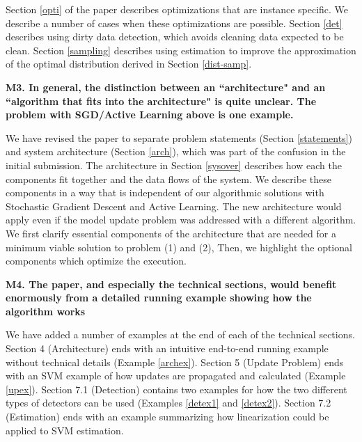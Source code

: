 Section \ref{opti} of the paper describes optimizations that are instance specific.
We describe a number of cases when these optimizations are possible. 
Section \ref{det} describes using dirty data detection, which avoids cleaning data expected to be clean.
Section \ref{sampling} describes using estimation to improve the approximation of the optimal distribution derived in Section \ref{dist-samp}. 

\vspace{0.5em}

\noindent\textbf{M3. In general, the distinction between an ``architecture" and an ``algorithm that fits into the architecture" is quite unclear. The problem with SGD/Active Learning above is one example.}

We have revised the paper to separate problem statements (Section \ref{statements}) and system architecture (Section \ref{arch}), which was part of the confusion in the initial submission.
The architecture in Section \ref{sysover} describes how each the components  fit together and the data flows of the system.
We describe these components in a way that is independent of our algorithmic solutions with Stochastic Gradient Descent and Active Learning.
The new architecture would apply even if the model update problem was addressed with a different algorithm.
We first clarify essential components of the architecture that are needed for a minimum viable solution to problem (1) and (2), 
Then, we highlight the optional components which optimize the execution.

\vspace{0.5em}

\noindent\textbf{M4. The paper, and especially the technical sections, would benefit enormously from a detailed running example showing how the algorithm works}

We have added a number of examples at the end of each of the technical sections. Section 4 (Architecture) ends with an intuitive end-to-end running example without technical details (Example \ref{archex}).
Section 5 (Update Problem) ends with an SVM example of how updates are propagated and calculated (Example \ref{upex}).
Section 7.1 (Detection) contains two examples for how the two different types of detectors can be used (Examples \ref{detex1} and \ref{detex2}).
Section 7.2 (Estimation) ends with an example summarizing how linearization could be applied to SVM estimation.

